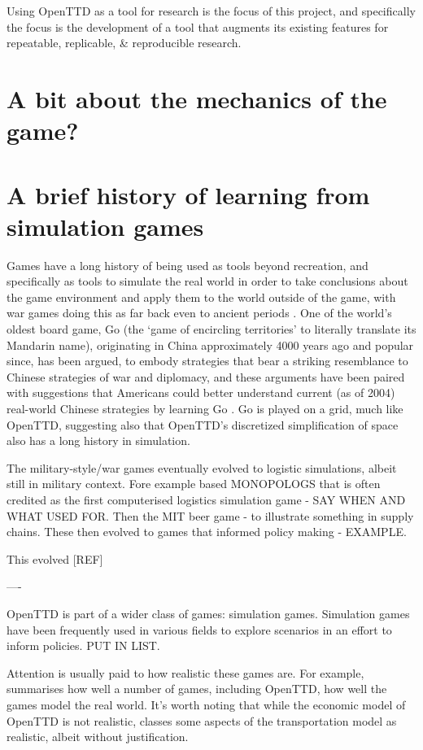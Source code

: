 \documentclass[logo,msc]{infthesis}           %
\begin{document}
Using OpenTTD as a tool for research is the focus of this project, and specifically the focus is the development of a tool that augments its existing features for repeatable, replicable, \& reproducible research.

\section{A bit about the mechanics of the game?}

\section{A brief history of learning from simulation games}

Games have a long history of being used as tools beyond recreation, and specifically as tools to simulate the real world in order to take conclusions about the game environment and apply them to the world outside of the game, with war games doing this as far back even to ancient periods \cite{mayer2009gaming}. One of the world's oldest board game, Go (the `game of encircling territories' to literally translate its Mandarin name), originating in China approximately 4000 years ago and popular since, has been argued, to embody strategies that bear a striking resemblance to Chinese strategies of war and diplomacy, and these arguments have been paired with suggestions that Americans could better understand current (as of 2004) real-world Chinese strategies by learning Go \cite{lai2004learning}. Go is played on a grid, much like OpenTTD, suggesting also that OpenTTD's discretized simplification of space also has a long history in simulation.

The military-style/war games eventually evolved to logistic simulations, albeit still in military context. Fore example based MONOPOLOGS \cite{jackson1959learning} that is often credited as the first computerised logistics simulation game - SAY WHEN AND WHAT USED FOR. Then the MIT beer game - to illustrate something in supply chains. These then evolved to games that informed policy making - EXAMPLE.


This evolved [REF]

----

OpenTTD is part of a wider class of games: simulation games. Simulation games have been frequently used in various fields to explore scenarios in an effort to inform policies. PUT IN LIST.

Attention is usually paid to how realistic these games are. For example, \cite{raghothama2013review} summarises how well a number of games, including OpenTTD, how well the games model the real world. It's worth noting that while the economic model of OpenTTD is not realistic, \cite{raghothama2013review} classes some aspects of the transportation model as realistic, albeit without justification.
\end{document}
